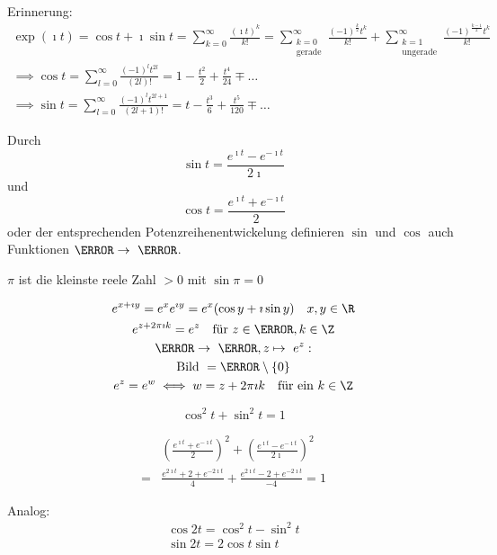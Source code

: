 Erinnerung:\\
\begin{gather*}
	\exp(\imath t) = \cos t + \imath \sin t = \sum_{k=0}^\infty \frac{(\imath t)^k}{k!} = \sum_{\substack{k=0\\\text{gerade}}}^\infty \frac{(-1)^{\frac{k}{2}} t^k}{k!} + \sum_{\substack{k=1\\\text{ungerade}}}^\infty \frac{(-1)^{\frac{k-1}{2}} t^k}{k!} \\
	\implies \cos t = \sum_{l=0}^\infty \frac{(-1)^l t^{2l}}{(2l)!} = 1 - \frac{t^2}{2} + \frac{t^4}{24} \mp \dots \\
	\implies \sin t = \sum_{l=0}^\infty \frac{(-1)^l t^{2l+1}}{(2l+1)!} = t - \frac{t^3}{6} + \frac{t^5}{120} \mp \dots
\end{gather*}
\begin{bem}
	Durch
	\[ \sin t = \frac{e^{\imath t} - e^{-\imath t}}{2\imath} \]
	und
	\[ \cos t = \frac{e^{\imath t} + e^{-\imath t}}{2} \]
	oder der entsprechenden Potenzreihenentwickelung definieren $\sin$ und $\cos$ auch Funktionen $\C \rightarrow \C$.
\end{bem}
\begin{bem}
	$\pi$ ist die kleinste reele Zahl $> 0$ mit $\sin \pi = 0$
\end{bem}
\begin{bem}
	\begin{gather*}
		e^{x + \imath y} = e^x e^{\imath y} = e^x ( \cos y + \imath \sin y) \quad x, y \in \R \\
		e^{z + 2\pi \imath k} = e^z \quad \text{für } z \in \C , k \in \Z \\
		\C \rightarrow \C , z \mapsto e^z : \\
		\text{Bild } = \C \setminus \{ 0 \} \\
		e^z = e^w \iff w = z + 2\pi \imath k \quad \text{für ein }k \in \Z
	\end{gather*}
\end{bem}
\begin{satz*}[note = Pythagoras , index = Pythagoras!Satz von]
	\[ \cos^2 t + \sin^2 t =1 \]
	\begin{bew}
		\[ \begin{split}
				&\left( \frac{e^{\imath t} + e^{-\imath t}}{2} \right)^2 + \left( \frac{e^{\imath t} - e^{-\imath t}}{2\imath} \right)^2 \\
			=	&\frac{e^{2\imath t} + 2 + e^{-2\imath t}}{4} + \frac{e^{2\imath t} - 2 + e^{-2\imath t}}{-4} = 1
		\end{split} \]
	\end{bew}
	Analog:
	\begin{gather*}
		\cos 2t = \cos^2 t - \sin^2 t \\
		\sin 2t = 2\cos t \sin t
	\end{gather*}
\end{satz*}

